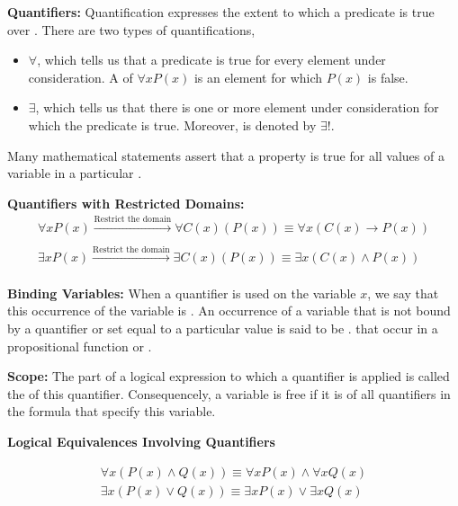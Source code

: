 \textbf{Quantifiers:} Quantification expresses the extent to which 
a predicate is true over  .
There are two types of quantifications, 
\begin{itemize}
  \item {} $\forall$, which tells us that a 
    predicate is true for every element under consideration.
    A  of $\forall{x}P(x)$ is an element for which 
    $P(x)$ is false.
  \item {} $\exists$, which tells us that there
    is one or more element under consideration for which the predicate is true.
    Moreover,  is denoted by $\exists!$.
\end{itemize}

Many mathematical statements assert that a property is true for all values of 
a variable in a particular .

\textbf{Quantifiers with Restricted Domains:}
\begin{align*}
  \forall{x}P(x) \xrightarrow[]{\text{Restrict the domain}} \forall{C(x)}(P(x)) \equiv \forall{x}(C(x) \rightarrow P(x)) \\
  \exists{x}P(x) \xrightarrow[]{\text{Restrict the domain}} \exists{C(x)}(P(x)) \equiv \exists{x}(C(x) \wedge P(x)) 
\end{align*}

\textbf{Binding Variables:} When a quantifier is used on the variable $x$,
we say that this occurrence of the variable is .
An occurrence of a variable that is not bound by a quantifier or set equal to 
a particular value is said to be .
 that occur in a propositional function 
 or 
.

\textbf{Scope:} The part of a logical expression to which a quantifier is 
applied is called the  of this quantifier.
Consequencely, a variable is free if it is  
of all quantifiers in the formula that specify this variable.

\textbf{Logical Equivalences Involving Quantifiers}

\begin{align*}
  \forall{x}(P(x) \wedge Q(x)) \equiv \forall{x}P(x) \wedge \forall{x}Q(x) \\
  \exists{x}(P(x) \vee Q(x)) \equiv \exists{x}P(x) \vee \exists{x}Q(x)
\end{align*}

